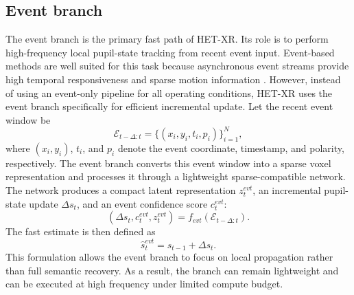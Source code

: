 \documentclass[journal]{IEEEtran}
\begin{document}
\subsection{Event branch}
The event branch is the primary fast path of HET-XR. Its role is to perform high-frequency local pupil-state tracking from recent event input. Event-based methods are well suited for this task because asynchronous event streams provide high temporal responsiveness and sparse motion information \cite{chen20233et,li2023track,li2024gaze,sen2024eyetraes,zhang2024swift,ding2025facet}. However, instead of using an event-only pipeline for all operating conditions, HET-XR uses the event branch specifically for efficient incremental update.
%
Let the recent event window be
\begin{equation}
\mathcal{E}_{t-\Delta:t}=\{(x_i,y_i,t_i,p_i)\}_{i=1}^{N},
\end{equation}
where $(x_i,y_i)$, $t_i$, and $p_i$ denote the event coordinate, timestamp, and polarity, respectively. The event branch converts this event window into a sparse voxel representation and processes it through a lightweight sparse-compatible network. The network produces a compact latent representation $z_t^{evt}$, an incremental pupil-state update $\Delta s_t$, and an event confidence score $c_t^{evt}$:
\begin{equation}
(\Delta s_t, c_t^{evt}, z_t^{evt}) = f_{evt}(\mathcal{E}_{t-\Delta:t}).
\end{equation}
%
The fast estimate is then defined as
\begin{equation}
\hat{s}_t^{evt} = s_{t-1} + \Delta s_t.
\end{equation}
This formulation allows the event branch to focus on local propagation rather than full semantic recovery. As a result, the branch can remain lightweight and can be executed at high frequency under limited compute budget.
%
\end{document}
